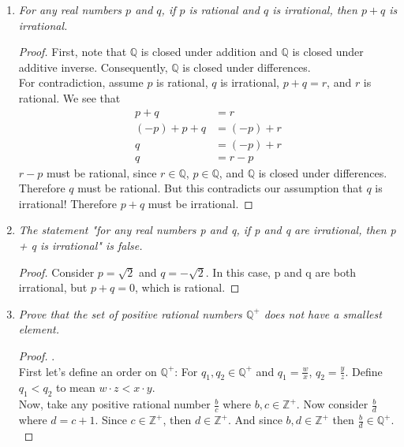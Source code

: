 \documentclass{amsart}
\begin{document}
\begin{enumerate}[1.]
\newpage

\item \emph{For any real numbers $p$ and $q$, if $p$ is rational and 
$q$ is irrational, then $p + q$ is irrational.}
\begin{proof}
First, note that $\mathbb{Q}$ is closed under addition and $\mathbb{Q}$ 
is closed under additive inverse. Consequently, $\mathbb{Q}$ is 
closed under differences. \\

For contradiction, assume $p$ is rational, $q$ is irrational, 
$p + q = r$, and $r$ is rational. We see that
\begin{align*}
    p + q &= r \\
    (-p) + p + q &= (-p) + r \\
    q &= (-p) + r \\
    q &= r - p
\end{align*}
$r - p$ must be rational, since $r\in\mathbb{Q}$, $p\in\mathbb{Q}$, and
$\mathbb{Q}$ is closed under differences. Therefore $q$ must be 
rational. But this contradicts our assumption that
$q$ is irrational! Therefore $p + q$ must be irrational.
\end{proof}

\newpage

\item \emph{The statement "for any real numbers p and q, if p and q are irrational, then p + q is irrational" is false.}
\begin{proof}
Consider $p = \sqrt{2}$ and $q = -\sqrt{2}$. In this case, p and q are 
both irrational, but $p + q = 0$, which is rational.

\end{proof}


\newpage

\item \emph{Prove that the set of positive rational numbers $\mathbb{Q}^+$ does not have a smallest element.}
\begin{proof} .\\

First let's define an order on $\mathbb{Q}^+$:
For $q_1, q_2\in\mathbb{Q}^+$ and $q_1=\frac{w}{x}$, 
$q_2=\frac{y}{z}$. Define $q_1 < q_2$ to mean $w\cdot z < x\cdot y$. \\

Now, take any positive rational number $\frac{b}{c}$ 
where $b,c\in\mathbb{Z}^+$. Now consider $\frac{b}{d}$ where $d=c+1$. 
Since $c\in\mathbb{Z}^+$, then $d\in\mathbb{Z}^+$. And since 
$b,d\in\mathbb{Z}^+$ then $\frac{b}{d}\in\mathbb{Q}^+$. \\


\end{proof}
\end{enumerate}
\end{document}

